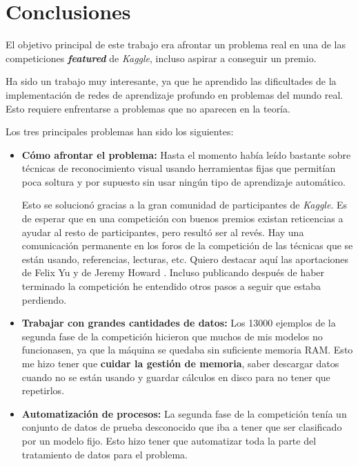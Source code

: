 
\chapter{Conclusiones} %
\label{chap:conclusiones} %

El objetivo principal de este trabajo era afrontar un problema real en una de
las competiciones \textit{\textbf{featured}} de \textit{Kaggle}, incluso
aspirar a conseguir un premio.

Ha sido un trabajo muy interesante, ya que he aprendido las dificultades
de la implementación de redes de aprendizaje profundo en problemas del
mundo real. Esto requiere enfrentarse a problemas que no aparecen en la teoría.

Los tres principales problemas han sido los siguientes:

\begin{itemize}
    \item{\textbf{Cómo afrontar el problema:}
     Hasta el momento había leído bastante sobre
    técnicas de reconocimiento visual usando herramientas fijas que permitían poca
    soltura y por supuesto sin usar ningún tipo de aprendizaje automático.

    Esto se solucionó gracias a la gran comunidad de participantes de
    \textit{Kaggle}. Es de esperar que en una competición con buenos premios
    existan reticencias a ayudar al resto de participantes, pero resultó ser al
    revés. Hay una comunicación permanente en los foros de la competición de las
    técnicas que se están usando, referencias, lecturas, etc. Quiero destacar aquí
    las aportaciones de Felix Yu \parencite{felixyu} y de Jeremy Howard
    \parencite{fastai}. Incluso publicando después de haber terminado la
    competición he entendido otros pasos a seguir que estaba perdiendo. }

    \item{\textbf{Trabajar con grandes cantidades de datos:}
    Los 13000 ejemplos de la segunda fase de la competición hicieron que muchos de
    mis modelos no funcionasen, ya que la máquina se quedaba sin suficiente memoria
    RAM. Esto me hizo tener que \textbf{cuidar la gestión de memoria}, saber
    descargar datos cuando no se están usando y guardar cálculos en disco para no
    tener que repetirlos.  }

    \item{\textbf{Automatización de procesos:}
    La segunda fase de la competición tenía un conjunto de datos de prueba
    desconocido que iba a tener que ser clasificado por un modelo fijo. Esto
    hizo tener que automatizar toda la parte del tratamiento de datos para el
    problema.  }

\end{itemize}

